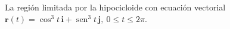 \item La región limitada por la hipocicloide con ecuación vectorial $\mathbf{r}(t) = \cos^3 t \, \mathbf{i} + \operatorname{sen}^3 t \, \mathbf{j}, \ 0 \le t \le 2\pi$.
